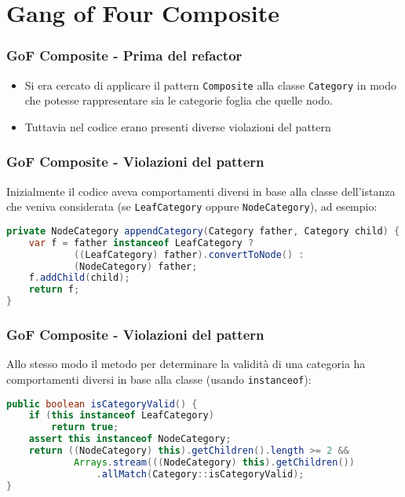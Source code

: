 \section{Gang of Four Composite}
\begin{frame}
    \frametitle{GoF Composite - Prima del refactor}

    \begin{minipage}{.5\textwidth}
        \begin{figure}
            \centering
        \end{figure}
    \end{minipage}
    \begin{minipage}{.49\textwidth}
        \begin{itemize}
            \item<1-> Si era cercato di applicare il pattern \texttt{Composite} alla classe \texttt{Category} in modo che potesse rappresentare sia le categorie foglia che quelle nodo.
            \item<2-> Tuttavia nel codice erano presenti diverse violazioni del pattern
        \end{itemize}
    \end{minipage}

\end{frame}

\begin{frame}[fragile]
    \frametitle{GoF Composite - Violazioni del pattern}

    Inizialmente il codice aveva comportamenti diversi in base alla classe dell'istanza che veniva considerata (se \texttt{LeafCategory} oppure \texttt{NodeCategory}), ad esempio:

    \lstset{style=java}
    \begin{lstlisting}[language=java, caption={v5 commit 34c1a67}]
private NodeCategory appendCategory(Category father, Category child) {
    var f = father instanceof LeafCategory ?
            ((LeafCategory) father).convertToNode() : 
            (NodeCategory) father;
    f.addChild(child);
    return f;
}
    \end{lstlisting}

\end{frame}

\begin{frame}[fragile]
    \frametitle{GoF Composite - Violazioni del pattern}

    Allo stesso modo il metodo per determinare la validità di una categoria ha comportamenti diversi in base alla classe (usando \texttt{instanceof}):

    \lstset{style=java}
    \begin{lstlisting}[language=java, caption={v5 commit 34c1a67}]
public boolean isCategoryValid() {
    if (this instanceof LeafCategory)
        return true;
    assert this instanceof NodeCategory;
    return ((NodeCategory) this).getChildren().length >= 2 &&
            Arrays.stream(((NodeCategory) this).getChildren())
                .allMatch(Category::isCategoryValid);
}
    \end{lstlisting}

\end{frame}

